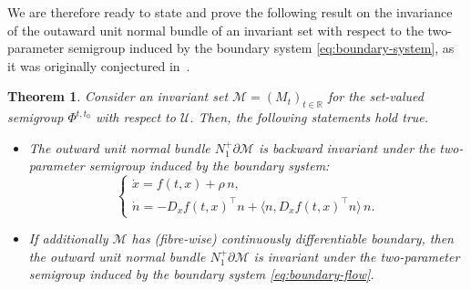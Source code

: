 \documentclass[reqno]{amsart}
\newtheorem{thm}{Theorem}[section]
\theoremstyle{definition}
\numberwithin{equation}{section}
\newcommand{\R}{\mathbb{R}}
\newcommand{\M}{\mathscr{M}}
\newcommand{\U}{\mathcal{U}}
\newcommand\note[1]{\marginpar{\flushleft\sffamily\tiny #1}}
\begin{document}
We are therefore ready to state and prove the following  result  on the invariance of the outaward unit normal bundle of an invariant set with respect to the two-parameter semigroup induced by the boundary system \eqref{eq:boundary-system}, as it was originally conjectured in~\cite{Tey2022minimal}.

 \begin{thm}\label{thm:BM-NAODE-inv}
     Consider an invariant set $\M=(M_t)_{t\in\R}$ for the set-valued semigroup $\Phi^{t,t_0}$ with respect to $\U$. Then, the following statements hold true.
     \begin{itemize}[leftmargin=18pt]
         \item[(i)] The outward unit normal bundle $N^+_1\partial \M$ is backward invariant under the two-parameter semigroup induced by the boundary system: 
         \begin{equation}\label{eq:boundary-flow}
     \begin{cases}
    \dot x=f(t,x)+\rho\,n,\\
    \dot n=-D_xf(t,x)^\top n+\langle n,D_xf(t,x)^\top n\rangle\, n.
\end{cases}
     \end{equation}
     \item[(ii)] If additionally $\M$ has (fibre-wise) continuously differentiable boundary, then the outward unit normal bundle $N^+_1\partial \M$ is invariant under the two-parameter semigroup induced by the boundary system \eqref{eq:boundary-flow}.
     \end{itemize}
 \end{thm}
\end{document}

